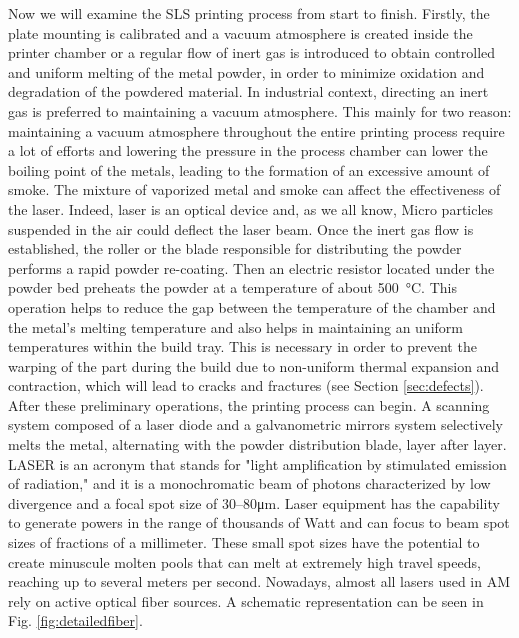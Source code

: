 Now we will examine the SLS printing process from start to finish. Firstly, the plate mounting is calibrated and a vacuum atmosphere is created inside the printer chamber or a regular flow of inert gas is introduced to obtain controlled and uniform melting of the metal powder, in order to minimize oxidation and degradation of the powdered material. In industrial context, directing an inert gas is preferred to maintaining a vacuum atmosphere. This mainly for two reason: maintaining a vacuum atmosphere throughout the entire printing process require a lot of efforts and lowering the pressure in the process chamber can lower the boiling point of the metals, leading to the formation of an excessive amount of smoke. The mixture of vaporized metal and smoke can affect the effectiveness of the laser. Indeed, laser is an optical device and, as we all know, Micro particles suspended in the air could deflect the laser beam. Once the inert gas flow is established, the roller or the blade responsible for distributing the powder performs a rapid powder re-coating. Then an electric resistor located under the powder bed preheats the powder at a temperature of about \SI{500}{\degreeCelsius}. This operation helps to reduce the gap between the temperature of the chamber and the metal's melting temperature and also helps in maintaining an uniform temperatures within the build tray. This is necessary in order to prevent the warping of the part during the build due to non-uniform thermal expansion and contraction, which will lead to cracks and fractures (see Section \ref{sec:defects}). After these preliminary operations, the printing process can begin. A scanning system composed of a laser diode and a galvanometric mirrors system selectively melts the metal, alternating with the powder distribution blade, layer after layer. LASER is an acronym that stands for "light amplification by stimulated emission of radiation," and it is a monochromatic beam of photons characterized by low divergence and a focal spot size of \numrange[range-phrase = --]{30}{80}\unit{\micro\metre}. Laser equipment has the capability to generate powers in the range of thousands of Watt and can focus to beam spot sizes of fractions of a millimeter. These small spot sizes have the potential to create minuscule molten pools that can melt at extremely high travel speeds, reaching up to several meters per second. Nowadays, almost all lasers used in AM rely on active optical fiber sources. A schematic representation can be seen in Fig. \ref{fig:detailedfiber}. 
